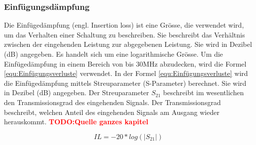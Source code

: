 \subsubsection{Einfügungsdämpfung}\label{subsec:einfuge}

Die Einfügedämpfung (engl. Insertion loss) ist eine Grösse, die verwendet wird, um das Verhalten einer Schaltung zu beschreiben. Sie beschreibt das Verhältnis zwischen der eingehenden Leistung zur abgegebenen Leistung. Sie wird in Dezibel (dB) angegeben. Es handelt sich um eine logarithmische Grösse. Um die Einfügedämpfung in einem Bereich von bis 30MHz abzudecken, wird die Formel \ref{equ:Einfügungsverluste} verwendet. In der Formel \ref{equ:Einfügungsverluste} wird die Einfügedämpfung mittels Streuparameter (S-Parameter) berechnet. Sie wird in Dezibel (dB) angegeben. Der Streuparameter $S_{21}$ beschreibt im wesentlichen den Transmissionsgrad des eingehenden Signals. Der Transmissionsgrad beschreibt, welchen Anteil des eingehenden Signals am Ausgang wieder herauskommt. \textcolor{red}{\textbf{TODO:Quelle ganzes kapitel}}



\begin{equation}\label{equ:Einfügungsverluste}
	IL = -20*log (\left\lvert S_{21} \right\rvert)
\end{equation}

\newpage

